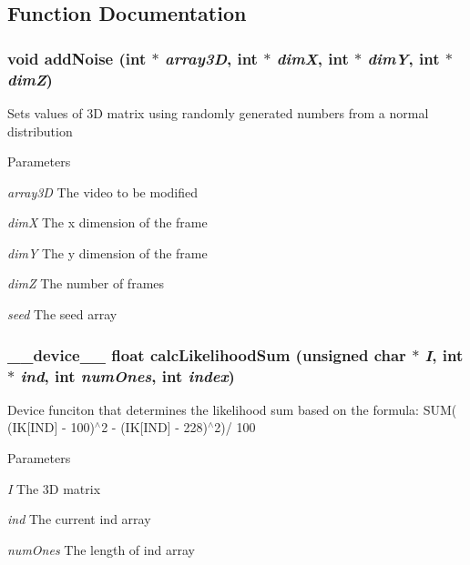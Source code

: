 \subsection{Function Documentation}
\hypertarget{ex__particle__CUDA__float_8cu_aafca6f71fe327a218fe6851db25c94c5}{
\subsubsection[{addNoise}]{\setlength{\rightskip}{0pt plus 5cm}void addNoise (int $\ast$ {\em array3D}, \/  int $\ast$ {\em dimX}, \/  int $\ast$ {\em dimY}, \/  int $\ast$ {\em dimZ})}}
\label{ex__particle__CUDA__float_8cu_aafca6f71fe327a218fe6851db25c94c5}
Sets values of 3D matrix using randomly generated numbers from a normal distribution 
\begin{DoxyParams}{Parameters}
\item[{\em array3D}]The video to be modified \item[{\em dimX}]The x dimension of the frame \item[{\em dimY}]The y dimension of the frame \item[{\em dimZ}]The number of frames \item[{\em seed}]The seed array \end{DoxyParams}
\hypertarget{ex__particle__CUDA__float_8cu_a592624798f72165183279ecc92a2eea5}{
\subsubsection[{calcLikelihoodSum}]{\setlength{\rightskip}{0pt plus 5cm}\_\-\_\-device\_\-\_\- float calcLikelihoodSum (unsigned char $\ast$ {\em I}, \/  int $\ast$ {\em ind}, \/  int {\em numOnes}, \/  int {\em index})}}
\label{ex__particle__CUDA__float_8cu_a592624798f72165183279ecc92a2eea5}
Device funciton that determines the likelihood sum based on the formula: SUM( (IK\mbox{[}IND\mbox{]} -\/ 100)$^\wedge$2 -\/ (IK\mbox{[}IND\mbox{]} -\/ 228)$^\wedge$2)/ 100 
\begin{DoxyParams}{Parameters}
\item[{\em I}]The 3D matrix \item[{\em ind}]The current ind array \item[{\em numOnes}]The length of ind array \end{DoxyParams}
